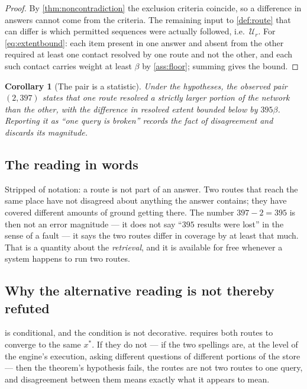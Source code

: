\documentclass[11pt,a4paper]{article}
\theoremstyle{plain}
\newtheorem{corollary}[theorem]{Corollary}
\theoremstyle{definition}
\theoremstyle{remark}
\newcommand{\Uset}{\mathcal{U}}
\begin{document}
\begin{proof}
By \cref{thm:noncontradiction} the exclusion criteria coincide, so a difference
in answers cannot come from the criteria. The remaining input to
\cref{def:route} that can differ is which permitted sequences were actually
followed, i.e.\ $\Uset_r$. For \cref{eq:extentbound}: each item present in one
answer and absent from the other required at least one contact resolved by one
route and not the other, and each such contact carries weight at least $\beta$
by \cref{ass:floor}; summing gives the bound.
\end{proof}

\begin{corollary}[The pair is a statistic]
\label{cor:statistic}
Under the hypotheses, the observed pair $(2,397)$ states that one route resolved
a strictly larger portion of the network than the other, with the difference in
resolved extent bounded below by $395\beta$. Reporting it as ``one query is
broken'' records the fact of disagreement and discards its magnitude.
\end{corollary}

\subsection{The reading in words}

Stripped of notation: a route is not part of an answer. Two routes that reach
the same place have not disagreed about anything the answer contains; they have
covered different amounts of ground getting there. The number $397 - 2 = 395$ is
then not an error magnitude --- it does not say ``$395$ results were lost'' in
the sense of a fault --- it says the two routes differ in coverage by at least
that much. That is a quantity about the \emph{retrieval}, and it is available
for free whenever a system happens to run two routes.

\subsection{Why the alternative reading is not thereby refuted}

 is conditional, and the condition is not decorative.
 requires both routes to converge to the same
$x^\ast$. If they do not --- if the two spellings are, at the level of the
engine's execution, asking different questions of different portions of the
store --- then the theorem's hypothesis fails, the routes are not two routes to
one query, and disagreement between them means exactly what it appears to mean.
\end{document}
